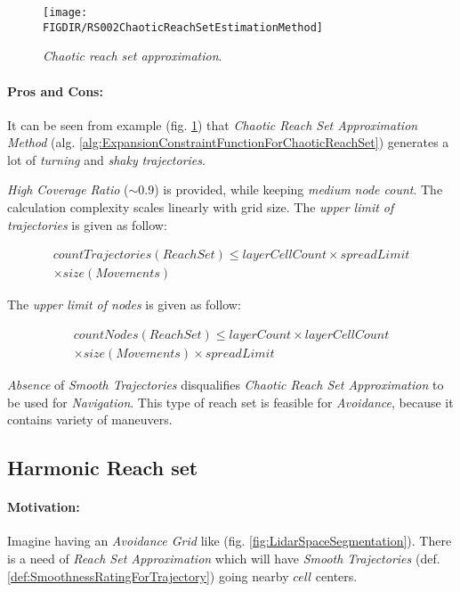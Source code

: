 \begin{figure}[H]
    \centering
    \texttt{[image: \\FIGDIR/RS002ChaoticReachSetEstimationMethod]} 
    \caption{\emph{Chaotic \emph{reach set} approximation}.}
    \label{fig:chaoticReachSetApproximation}
\end{figure}


\paragraph{Pros and Cons:} It can be seen from example (fig. \ref{fig:chaoticReachSetApproximation}) that \emph{Chaotic Reach Set Approximation Method} (alg. \ref{alg:ExpansionConstraintFunctionForChaoticReachSet}) generates a lot of \emph{turning} and \emph{shaky} \emph{trajectories}. 

\emph{High Coverage Ratio} ($\sim 0.9$) is provided, while keeping \emph{medium node count}. The calculation complexity scales linearly with grid size. The \emph{upper limit of trajectories} is given as follow:

\begin{multline}
    countTrajectories(ReachSet) \le layerCellCount \times spreadLimit\\ \times size(Movements)
\end{multline}

\noindent The \emph{upper limit of nodes} is given as follow:
    
\begin{multline}
    countNodes(ReachSet) \le layerCount \times  layerCellCount  \\
    \times size(Movements) \times spreadLimit  
\end{multline}

\noindent\emph{Absence} of \emph{Smooth Trajectories} disqualifies \emph{Chaotic Reach Set Approximation} to be used for \emph{Navigation}. This type of reach set is feasible for \emph{Avoidance}, because it contains variety of maneuvers.


\subsection{Harmonic Reach set}\label{s:harmonicReachSet}

\paragraph{Motivation:} Imagine having an \emph{Avoidance Grid} like (fig. \ref{fig:LidarSpaceSegmentation}). There is a need of \emph{Reach Set Approximation} which will have \emph{Smooth Trajectories} (def. \ref{def:SmoothnessRatingForTrajectory}) going nearby $cell$ centers.

